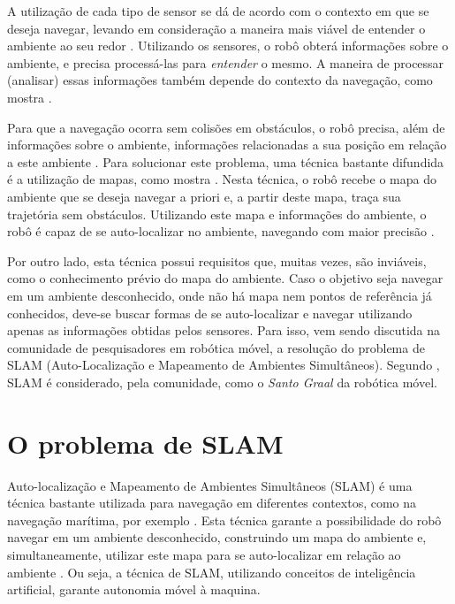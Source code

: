 A utilização de cada tipo de sensor se dá de acordo com o contexto em que se deseja navegar, levando em consideração a maneira mais viável de entender o ambiente ao seu redor \cite{agenteExploratorioKalman}. Utilizando os sensores, o robô obterá informações sobre o ambiente, e precisa processá-las para \textit{entender} o mesmo. A maneira de processar (analisar) essas informações também depende do contexto da navegação, como mostra \cite{roboBulldozerIV}.

Para que a navegação ocorra sem colisões em obstáculos, o robô precisa, além de informações sobre o ambiente, informações relacionadas a sua posição em relação a este ambiente \cite{theCleaningProject}. Para solucionar este problema, uma técnica bastante difundida é a utilização de mapas, como mostra \cite{roboBulldozerIV}. Nesta técnica, o robô recebe o mapa do ambiente que se deseja navegar a priori e, a partir deste mapa, traça sua trajetória sem obstáculos. Utilizando este mapa e informações do ambiente, o robô é capaz de se auto-localizar no ambiente, navegando com maior precisão \cite{roboBulldozerIV}.

Por outro lado, esta técnica possui requisitos que, muitas vezes, são inviáveis, como o conhecimento prévio do mapa do ambiente. Caso o objetivo seja navegar em um ambiente desconhecido, onde não há mapa nem pontos de referência já conhecidos, deve-se buscar formas de se auto-localizar e navegar utilizando apenas as informações obtidas pelos sensores. Para isso, vem sendo discutida na comunidade de pesquisadores em robótica móvel, a resolução do problema de SLAM (Auto-Localização e Mapeamento de Ambientes Simultâneos). Segundo \cite{slamProblem}, SLAM é considerado, pela comunidade, como o \textit{Santo Graal} da robótica móvel.

\section{O problema de SLAM} %
\label{sec:section_name}

Auto-localização e Mapeamento de Ambientes Simultâneos (SLAM) é uma técnica bastante utilizada para navegação em diferentes contextos, como na navegação marítima, por exemplo \cite{slamProblem}. Esta técnica garante a possibilidade do robô navegar em um ambiente desconhecido, construindo um mapa do ambiente e, simultaneamente, utilizar este mapa para se auto-localizar em relação ao ambiente \cite{slamProblem}. Ou seja, a técnica de SLAM, utilizando conceitos de inteligência artificial, garante autonomia móvel à maquina.

